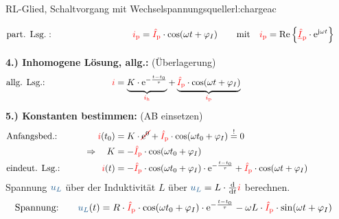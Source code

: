 {\begin{bsp}{RL-Glied, Schaltvorgang mit Wechselspannungsquelle}{rl:chargeac}
\begin{align*}
                &\text{part. Lsg.}:&&&
                    \eci{i_{\mathrm p}} &= \eci{\hat{I}_{\mathrm p}} \cdot \cos(\omega t + \varphi_I) &&&
                    &\text{mit}\quad \eci{i_{\mathrm p}} = \Re\left\{\eci{\underline{\hat{I}}_{\mathrm p}} \cdot \mathrm{e}^{\mathrm{j}\omega t}\right\} \vphantom{\Bigg|}
            \\[-15pt]&\hphantom{R1oooooooooo}&&&\hphantom{L3ooooooooooo}&\hphantom{R3ooooooooooooooo}&&&&\hphantom{R5ooooooooooooooooooooooo}\nonumber%
        \end{align*}%
        \textbf{4.) Inhomogene Lösung, allg.:} (Überlagerung)%
        \begin{align*}
                &\text{allg. Lsg.:}&&&
                    \eci{i} &=
                    \underbrace{ \vphantom{\big|}
                        K \cdot \mathrm{e}^{-\frac{t-t_0}{\tau}}
                    }_{\eci{i_{\mathrm h}}}
                    +
                    \underbrace{ \vphantom{\big|}
                        \eci{\hat{I}_{\mathrm p}} \cdot \cos(\omega t + \varphi_I)
                    }_{\eci{i_{\mathrm p}}}&&&
            \\[-15pt]&\hphantom{R1oooooooooo}&&&\hphantom{L3oooooo}&\hphantom{R3ooooooooooooooooooooooooooooooooooooooooooo}&&&&\hphantom{R5}\nonumber%
        \end{align*}
        \textbf{5.) Konstanten bestimmen:} (AB einsetzen)%
        \begin{align*}
            &\text{Anfangsbed.:}&&&
                \eci{i}(t_0) &= K \cdot \redcancel{\mathrm{e}^0} + \eci{\hat{I}_{\mathrm p}} \cdot \cos(\omega t_0 + \varphi_I) \overset{!}{=} 0 \\
            &&&&
                \Rightarrow\quad K &= -\eci{\hat{I}_{\mathrm p}} \cdot \cos(\omega t_0 + \varphi_I) \\
            &\text{eindeut. Lsg.:}&&&
                \eci{i}(t) &= -\eci{\hat{I}_{\mathrm p}} \cdot \cos(\omega t_0 + \varphi_I) \cdot \mathrm{e}^{-\frac{t-t_0}{\tau}} + \eci{\hat{I}_{\mathrm p}} \cdot \cos(\omega t + \varphi_I)
            \\[-15pt]&\hphantom{R1oooooooooo}&&&\hphantom{L3oooooo}&\hphantom{R3ooooooooooooooooooooooooooooooooooooooooooo}&&&&\hphantom{R5}\nonumber%
        \end{align*}
        Spannung $\ecv{u_L}$ über der Induktivität $L$ über $\ecv{u_L} = L \cdot \frac{\mathrm{d}}{\mathrm{d}t} \eci{i}$ berechnen.
        \begin{align*}
            &\text{Spannung:}&&&
                \ecv{u_L}(t) &= R \cdot \eci{\hat{I}_{\mathrm p}} \cdot \cos(\omega t_0 + \varphi_I) \cdot \mathrm{e}^{-\frac{t-t_0}{\tau}} - \omega L \cdot \eci{\hat{I}_{\mathrm p}} \cdot \sin(\omega t + \varphi_I)
        \end{align*}
    \end{bsp}
}%

